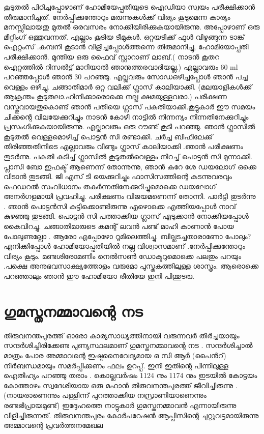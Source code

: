 \documentclass[10pt,a4paper]{report}
\begin{document}
  കൂടുതൽ പിഠിച്ചപ്പോഴാണ് ഹോമിയേപ്പതിയുടെ ഐഡിയാ സ്വയം പരീക്ഷിക്കാൻ തീരുമാനിച്ചത്. നേർപ്പിക്കുന്തോറും മരുന്നുകൾക്ക് വിര്യം കൂടുമെന്ന കാര്യം മനസ്സിലായതു മുതൽ ഒരവസരം നോക്കിയിരിക്കുകയായിരുന്നു. അപ്പോഴാണ് ഒരു മീറ്റിംഗ് ഒത്തുവന്നത്. എല്ലാം കൂടിയ ടീമുകൾ. ഒറ്റയടിക്ക് ഫുൾ വിഴുങ്ങുന്ന ടാങ്ക് ഐറ്റംസ് .കമ്പനി കൂടാൻ വിളിച്ചപ്പോൾത്തന്നെ തിരുമാനിച്ചു, ഹോമിയോപ്പതി പരീക്ഷിക്കാൻ. മുന്തിയ ഒരു ഫൈവ് സ്റ്റാറാണ് ലാബ്.( നാടൻ കൂതറ ഐറ്റത്തിൽ റിസൽട്ട് മാറിയാൽ ഞാനുത്തരവാദിയല്ല.) എല്ലാവരും 60 ml പറഞ്ഞപ്പോൾ ഞാൻ 30 പറഞ്ഞു. എല്ലവരും സോഡഒഴിച്ചപ്പോൾ ഞാൻ പച്ച വെള്ളം ഒഴിച്ചു. ചങ്ങാതിമാർ ഒറ്റ വലിക്ക് ഗ്ലാസ് കാലിയാക്കി. (മലയാളികൾക്ക് ആക്രന്തം കൂടുതലാ.ഹിന്ദിക്കാരൊക്കെ നല്ല ക്ഷമയുള്ളവരാ.) പരീക്ഷണ വസ്തുവായതുകൊണ്ട് ഞാൻ പതിയെ ഗ്ലാസ് പകുതിയാക്കി.കൂട്ടുകാർ ഈ സമയം ചിക്കന്റെ വിലയേക്കുറിച്ചും നാടൻ കോഴി നാട്ടിൽ നിന്നന്യം നിന്നതിനേക്കുറിച്ചും പ്രസംഗിക്കുകയായിരുന്നു. എല്ലാവരും ഒരു റൗണ്ട് കൂടി പറഞ്ഞു. ഞാൻ ഗ്ലാസിൽ കൂടുതൽ വെള്ളമൊഴിച്ച് പൊട്ടൻ സി രണ്ടാക്കി. ചർച്ച ബിഫിലേക്ക് തിരിഞ്ഞതിനിടെ എല്ലാവരും വീണ്ടും ഗ്ലാസ് കാലിയാക്കി .ഞാൻ പരീക്ഷണം തുടർന്നു. പകുതി കുടിച്ച് ഗ്ലാസിൽ കൂടുതൽവെള്ളം നിറച്ച് പൊട്ടൻ സി മുന്നാക്കി. പ്ലാസി ബോ ഇഫക്ട് ആണെന്ന് തോന്നുന്നു, ഞാൻ കുറേ ശേ ഡയലോഗ് ഒക്കെ വിടാൻ തുടങ്ങി. ജി എസ് ടി യെക്കുറിച്ചും ഫാസിസത്തിന്റെ കടന്നുവരവും ഫെഡറൽ സംവിധാനം തകർന്നതിനേക്കുറിച്ചുമൊക്കെ ഡയലോഗ് അനർഗളമായി പ്രവഹിച്ചു. പരീക്ഷണം വിജയമണെന്ന് തോന്നി. പാർട്ടി തുടർന്നു . ഞാൻ പൊട്ടൻസി കുട്ടിക്കൊണ്ടിരുന്നു എഴൊക്കെ എത്തിയപ്പോൾ നാവ് കുഴഞ്ഞു തുടങ്ങി. പൊട്ടൻ സി പത്താക്കിയ ഗ്ലാസ് എടുക്കാൻ നോക്കിയപ്പോൾ കൈവിറച്ചു. ചങ്ങാതിമാരുടെ കമന്റ് ലവൻ പണ്ട് മാഹി കാണാൻ പോയ പോലുണ്ടല്ലോ . ആരോ എപ്പോഴോ റൂമിലെത്തിച്ചു. ബില്ലടച്ചതാരാണോ പോലും? എനിക്കിപ്പോൾ ഹോമിയോപ്പതിയിൽ നല്ല വിശ്വാസമാണ് .നേർപ്പിക്കുന്തോറും വിര്യം കൂടും. മണ്ടശിരോമണിം നെൽസൺ ഡോക്ടറുമൊക്കെ പലതും പറയും .പക്ഷെ അനുഭവസാക്ഷ്യത്തോളം വരുമോ പുസ്തകത്തിലുള്ള ശാസ്ത്രം. ആരൊക്കെ പറഞ്ഞാലും ഞാൻ ഈ ഹോമിയോ രീതിയേ ഇനി പിന്തുടരു.
  


\section{
 ഗുമസ്തനമ്മാവന്റെ നട }  
  
  തിരുവനന്തപുരത്ത് ഓരോ കാര്യസാധ്യത്തിനായി വരുന്നവർ തീർച്ചയായും സന്ദർശിച്ചിരിക്കേണ്ട പുണ്യസ്ഥലമാണ് ഗുമസ്തനമ്മാവന്റെ നട . സന്ദർശിച്ചാൽ മാത്രം പോര അമ്മാവന്റെ ഇഷ്ടനൈവേദ്യമായ ഒ സി ആർ (പൈൻറ്) നിർബന്ധമായും സമർപ്പിക്കണം ഫലം ഉറപ്പ്. ഇനി ഇതിന്റെ പിന്നിലുള്ള ഐതിഹ്യം പറഞ്ഞു തരാം . കൊല്ലവർഷം 1124 നും 1174 നും ഇടയിൽ കോട്ടയം കോത്താഴം സ്വദേശിയായ ഒരു മഹാൻ തിരുവനന്തപുരത്ത് ജീവിച്ചിരുന്നു . (നായരാണെന്നും പള്ളിന്ന് പുറത്താക്കിയ നസ്രാണിയാണെന്നും രണ്ടഭിപ്രായമുണ്ട്) ഇദ്ദേഹത്തെ നാട്ടുകാർ ഗുമസ്തനമ്മാവൻ എന്നായിരുന്നു വിളിച്ചിരുന്നത്. തിരുവനന്തപുരം കോർപറേഷൻ ആപ്പിസിന്റെ ചുറ്റുവട്ടമായിരുന്നു അമ്മാവന്റെ പ്രവർത്തനമേഖല 
\end{document}
